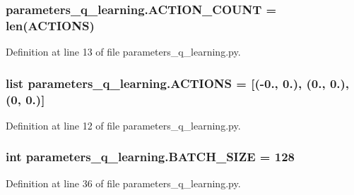 \subsubsection[{\texorpdfstring{A\+C\+T\+I\+O\+N\+\_\+\+C\+O\+U\+NT}{ACTION_COUNT}}]{\setlength{\rightskip}{0pt plus 5cm}parameters\+\_\+q\+\_\+learning.\+A\+C\+T\+I\+O\+N\+\_\+\+C\+O\+U\+NT = len({\bf A\+C\+T\+I\+O\+NS})}\hypertarget{namespaceparameters__q__learning_a5342e6c6e46b1e1fe5004c3988bc5dd2}{}\label{namespaceparameters__q__learning_a5342e6c6e46b1e1fe5004c3988bc5dd2}


Definition at line 13 of file parameters\+\_\+q\+\_\+learning.\+py.

\subsubsection[{\texorpdfstring{A\+C\+T\+I\+O\+NS}{ACTIONS}}]{\setlength{\rightskip}{0pt plus 5cm}list parameters\+\_\+q\+\_\+learning.\+A\+C\+T\+I\+O\+NS = \mbox{[}(-\/0., 0.), (0., 0.), (0, 0.)\mbox{]}}\hypertarget{namespaceparameters__q__learning_a66c8c40f5320c99b1f1c3ed1fdd758e1}{}\label{namespaceparameters__q__learning_a66c8c40f5320c99b1f1c3ed1fdd758e1}


Definition at line 12 of file parameters\+\_\+q\+\_\+learning.\+py.

\subsubsection[{\texorpdfstring{B\+A\+T\+C\+H\+\_\+\+S\+I\+ZE}{BATCH_SIZE}}]{\setlength{\rightskip}{0pt plus 5cm}int parameters\+\_\+q\+\_\+learning.\+B\+A\+T\+C\+H\+\_\+\+S\+I\+ZE = 128}\hypertarget{namespaceparameters__q__learning_a5691eccf1d7dfa8b1192765cfab78da2}{}\label{namespaceparameters__q__learning_a5691eccf1d7dfa8b1192765cfab78da2}


Definition at line 36 of file parameters\+\_\+q\+\_\+learning.\+py.

